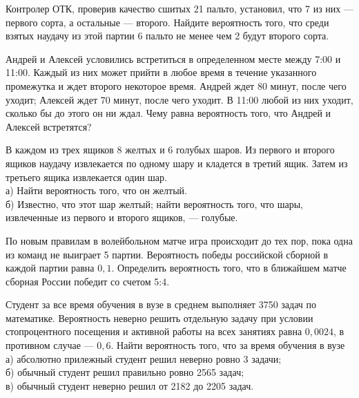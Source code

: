 \newpage\setcounter{zad}{0}



\begin{zkrW}{20}\noindent 
	Контролер ОТК, проверив качество сшитых 21 пальто, установил, что 7 из них --- первого сорта, а остальные --- второго. Найдите вероятность того, что среди взятых наудачу из этой партии 6 пальто не менее чем 2 будут второго сорта.
 
\end{zkrW}

\begin{zkrW}{20}\noindent 
	Андрей и Алексей условились встретиться в определенном месте между 7:00 и 11:00. Каждый из них может прийти в любое время в течение указанного промежутка и ждет второго некоторое время. Андрей ждет 80 минут, после чего уходит; Алексей ждет 70 минут, после чего уходит. В 11:00 любой из них уходит, сколько бы до этого он ни ждал. Чему равна вероятность того, что Андрей и Алексей встретятся?
 
\end{zkrW}

\begin{zkrW}{20}\noindent 
	В каждом из трех ящиков 8 желтых и 6 голубых шаров. Из первого и второго ящиков наудачу извлекается по одному шару и кладется в третий ящик. Затем из третьего ящика извлекается один шар. \\ \indent а) Найти вероятность того, что он желтый. \\ \indent б) Известно, что этот шар желтый; найти вероятность того, что шары, извлеченные из первого и второго ящиков, --- голубые.
 
\end{zkrW}

\begin{zkrW}{20}\noindent 
	По новым правилам в волейбольном матче игра происходит до тех пор, пока одна из команд не выиграет 5 партии. Вероятность победы российской сборной в каждой партии равна $0{,}1$. Определить вероятность того, что в ближайшем матче сборная России победит со счетом 5:4.
 
\end{zkrW}

\begin{zkrW}{20}\noindent 
	Студент за все время обучения в вузе в среднем выполняет 3750 задач по математике. Вероятность неверно решить отдельную задачу при условии стопроцентного посещения и активной работы на всех занятиях равна $0{,}0024$, в противном случае --- $0{,}6$. Найти вероятность того, что за время обучения в вузе \\ \indent а) абсолютно прилежный студент решил неверно ровно 3 задачи; \\ \indent б) обычный студент решил правильно ровно 2565 задач; \\ \indent в) обычный студент неверно решил от 2182 до 2205 задач.
 
\end{zkrW}

